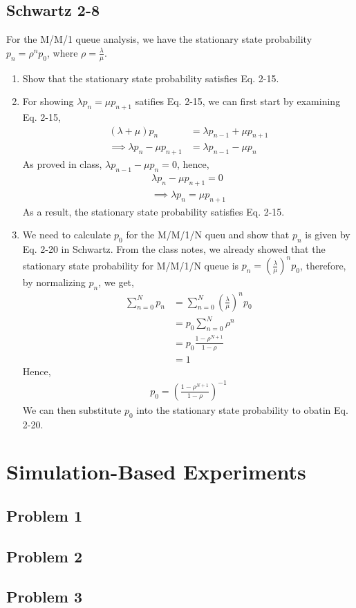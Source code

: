 \documentclass{article}
\begin{document}
		\subsection*{Schwartz 2-8}
			For the M/M/1 queue analysis, we have the stationary state probability $p_{n} = \rho^{n} p_{0}$,
			where $\rho = \frac{\lambda}{\mu}$.
			\begin{enumerate}
				\item Show that the stationary state probability satisfies Eq. 2-15.
				\item For showing $\lambda p_{n} = \mu p_{n+1}$ satifies Eq. 2-15, we
					can first start by examining Eq. 2-15,
					\begin{align*}
						(\lambda + \mu) p_{n} &= \lambda p_{n-1} + \mu p_{n+1} \\
						\implies \lambda p_{n} - \mu p_{n+1} &= \lambda p_{n-1} - \mu p_{n}
					\end{align*}
					As proved in class, $\lambda p_{n-1} - \mu p_{n} = 0$, hence,
					\begin{gather*}
						\lambda p_{n} - \mu p_{n+1} = 0 \\
						\implies \lambda p_{n} = \mu p_{n+1} 
					\end{gather*}
					As a result, the stationary state probability satisfies Eq. 2-15.
				\item We need to calculate $p_{0}$ for the M/M/1/N queu and show that $p_{n}$
					is given by Eq. 2-20 in Schwartz.
					From the class notes, we already showed that the stationary state
					probability for M/M/1/N queue is $p_{n} = (\frac{\lambda}{\mu})^n p_{0}$,
					therefore, by normalizing $p_{n}$, we get,
					\begin{align*}
						\sum_{n=0}^{N} p_{n} &= \sum_{n=0}^{N} (\frac{\lambda}{\mu})^n p_{0} \\
						&= p_{0} \sum_{n=0}^{N} \rho^{n} \\
						&= p_{0} \frac{1 - \rho^{N+1}}{1 - \rho} \\
						&= 1
					\end{align*}
					Hence,
					\begin{gather*}
						p_{0} = (\frac{1 - \rho^{N+1}}{1 - \rho})^{-1}
					\end{gather*}
					We can then substitute $p_{0}$ into the stationary state probability
					to obatin Eq. 2-20.
			\end{enumerate}

\section*{Simulation-Based Experiments}
	\subsection*{Problem 1}

	\subsection*{Problem 2}

	\subsection*{Problem 3}
\end{document}
